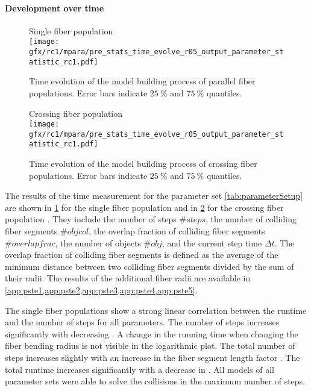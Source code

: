 \paragraph{Development over time}
%
\begin{figure}[p]
\centering
Single fiber population \pfbs{}\\[0em]
\texttt{[image: gfx/rc1/mpara/pre\_stats\_time\_evolve\_r05\_output\_parameter\_statistic\_rc1.pdf]}
\caption{Time evolution of the model building process of parallel fiber populations. Error bars indicate $\SI{25}{\percent}$ and $\SI{75}{\percent}$ quantiles.}
\label{fig:timeDevelopmentNone}
\end{figure}
%
\begin{figure}[p]
\centering
Crossing fiber population \cfbs{}\\[0ex]
\texttt{[image: gfx/rc1/mpara/pre\_stats\_time\_evolve\_r05\_output\_parameter\_statistic\_rc1.pdf]}
\caption{Time evolution of the model building process of crossing fiber populations. Error bars indicate $\SI{25}{\percent}$ and $\SI{75}{\percent}$ quantiles.}
\label{fig:timeDevelopmentCross}
\end{figure}
%
The results of the time measurement for the parameter set \cref{tab:parameterSetup} are shown in \cref{fig:timeDevelopmentNone} for the single fiber population \pfbs{} and in \cref{fig:timeDevelopmentCross} for the crossing fiber population \cfbs{}.
They include the number of steps $\# steps$, the number of colliding fiber segments $\# objcol$, the overlap fraction of colliding fiber segments $\# overlapfrac$, the number of objects $\# obj$, and the current step time $\Delta t$.
The overlap fraction of colliding fiber segments is defined as the average of the minimum distance between two colliding fiber segments divided by the sum of their radii.
The results of the additional fiber radii are available in \cref{app:pste1,app:pste2,app:pste3,app:pste4,app:pste5}.
\par
%
The single fiber populations \pfbs{} show a strong linear correlation between the runtime and the number of steps for all parameters.
The number of steps increases significantly with decreasing \segLengthFactor{}.
A change in the running time when changing the fiber bending radius \segRadiusFactor{} is not visible in the logarithmic plot.
The total number of steps increases slightly with an increase in the fiber segment length factor \segLengthFactor{}.
The total runtime increases significantly with a decrease in \segLengthFactor{}.
All models of all parameter sets were able to solve the collisions in the maximum number of steps.
